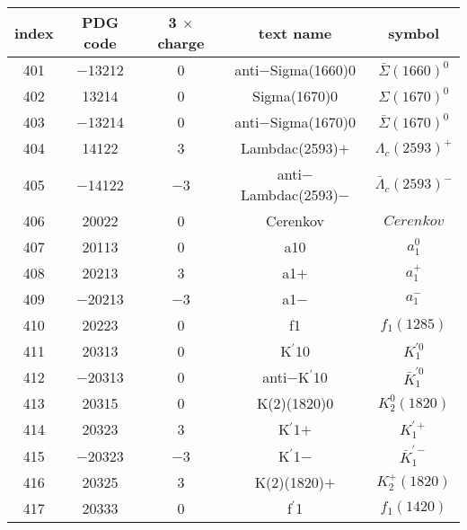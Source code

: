 \documentclass{article}
\begin{document}
\begin{table}[!htbp]
\centering
\begin{tabular}{|c|c|c|c|c|}
\hline
index & PDG code & 3 $\times$ charge & text name & symbol \\
\hline
401 & $-$13212 & 0 & anti$-$Sigma(1660)0 & $\bar{\Sigma}(1660)^{0}$ \\
\hline
402 & 13214 & 0 & Sigma(1670)0 & $\Sigma(1670)^{0}$ \\
\hline
403 & $-$13214 & 0 & anti$-$Sigma(1670)0 & $\bar{\Sigma}(1670)^{0}$ \\
\hline
404 & 14122 & 3 & Lambda\underline{\hspace{0.6em}}c(2593)$+$ & $\Lambda_{c}(2593)^{+}$ \\
\hline
405 & $-$14122 & $-$3 & anti$-$Lambda\underline{\hspace{0.6em}}c(2593)$-$ & $\bar{\Lambda}_{c}(2593)^{-}$ \\
\hline
406 & 20022 & 0 & Cerenkov & $Cerenkov$ \\
\hline
407 & 20113 & 0 & a\underline{\hspace{0.6em}}10 & $a_{1}^{0}$ \\
\hline
408 & 20213 & 3 & a\underline{\hspace{0.6em}}1$+$ & $a_{1}^{+}$ \\
\hline
409 & $-$20213 & $-$3 & a\underline{\hspace{0.6em}}1$-$ & $a_{1}^{-}$ \\
\hline
410 & 20223 & 0 & f\underline{\hspace{0.6em}}1 & $f_{1}(1285)$ \\
\hline
411 & 20313 & 0 & K$^{\prime}$\underline{\hspace{0.6em}}10 & $K_1^{'0}$ \\
\hline
412 & $-$20313 & 0 & anti$-$K$^{\prime}$\underline{\hspace{0.6em}}10 & $\bar{K}_1^{'0}$ \\
\hline
413 & 20315 & 0 & K(2)(1820)0 & $K_2^0(1820)$ \\
\hline
414 & 20323 & 3 & K$^{\prime}$\underline{\hspace{0.6em}}1$+$ & $K_1^{'+}$ \\
\hline
415 & $-$20323 & $-$3 & K$^{\prime}$\underline{\hspace{0.6em}}1$-$ & $\bar{K}_1^{'-}$ \\
\hline
416 & 20325 & 3 & K(2)(1820)$+$ & $K_2^+(1820)$ \\
\hline
417 & 20333 & 0 & f$^{\prime}$\underline{\hspace{0.6em}}1 & $f_{1}(1420)$ \\

\end{tabular}
\end{table}
\end{document}
